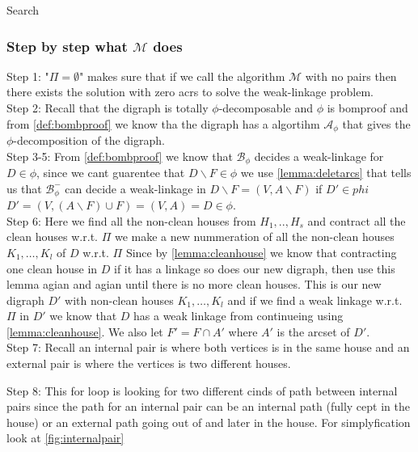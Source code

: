 \documentclass{beamer}
\begin{document}
\begin{frame}[allowframebreaks]{Search}
    \frametitle{Step by step what $\mathcal{M}$ does}
     
    Step 1: "$\Pi=\emptyset$" makes sure that if we call the algorithm $\mathcal{M}$ with no pairs then there exists the solution with zero acrs to solve the weak-linkage problem. \\

    Step 2: Recall that the digraph is totally $\phi$-decomposable and $\phi$ is bomproof and from \autoref{def:bombproof} we know tha the digraph has a algortihm $\mathcal{A}_{\phi}$ that gives the $\phi$-decomposition of the digraph. \\

    Step 3-5: From \autoref{def:bombproof} we know that $\mathcal{B}_{\phi}$ decides a weak-linkage for $D\in \phi$, since we cant guarentee that $D\backslash F \in \phi$ we use \autoref{lemma:deletarcs} that tells us that $\mathcal{B}_{\phi}^-$ can decide a weak-linkage in $D\backslash F=(V,A\backslash F)$ if $D' \in phi$ $D'=(V,(A\backslash F)\cup F)=(V,A)=D\in \phi$. \\

    Step 6: Here we find all the non-clean houses from $H_1,..,H_s$ and contract all the clean houses w.r.t. $\Pi$ we make a new nummeration of all the non-clean houses $K_1,\dots ,K_l$ of $D$ w.r.t. $\Pi$
    Since by \autoref{lemma:cleanhouse} we know that contracting one clean house in $D$ if it has a linkage so does our new digraph, then use this lemma agian and agian until there is no more clean houses.
    This is our new digraph $D'$ with non-clean houses $K_1,\dots,K_l$ and if we find a weak linkage w.r.t. $\Pi$ in $D'$ we know that $D$ has a weak linkage from continueing using \autoref{lemma:cleanhouse}.
    We also let $F'=F\cap A'$ where $A'$ is the arcset of $D'$.\\

    Step 7: Recall an internal pair is where both vertices is in the same house and an external pair is where the vertices is two different houses. 

    Step 8: This for loop is looking for two different cinds of path between internal pairs since the path for an internal pair can be an internal path (fully cept in the house) or an external path going out of and later in the house. 
    For simplyfication look at \autoref{fig:internalpair}
    \begin{figure}
        \label{fig:internalpair}
    \end{figure}


\end{frame}
\end{document}
